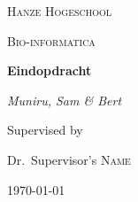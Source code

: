 \thispagestyle{empty}
\begin{center}
   \vspace*{1cm}
   {\scshape\LARGE Hanze Hogeschool \par}
   \vspace{1cm}
   {\scshape\Large Bio-informatica\par}
   \vspace{3cm}
   {\huge\bfseries Eindopdracht\par}
   \vspace{2cm}
   {\Large\itshape Muniru, Sam \& Bert\par}
   \vfill
   Supervised by\par
   Dr.~Supervisor's \textsc{Name}
   \vfill
   {\large \today\par}
\end{center}
\newpage

\setcounter{page}{1}